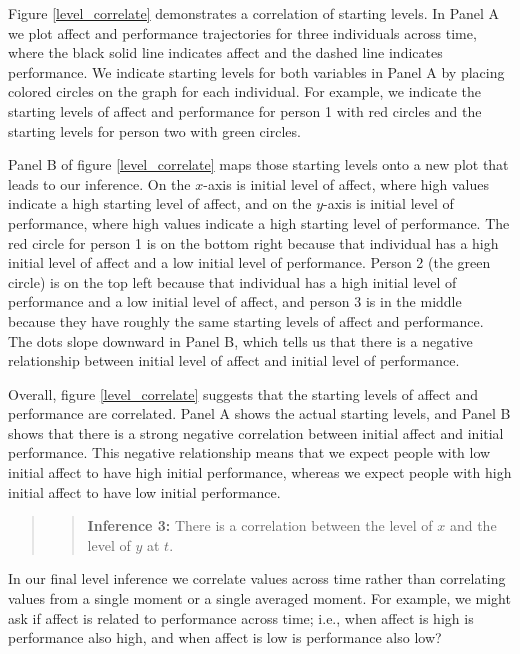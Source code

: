 \documentclass[english,,man]{apa6}
\theoremstyle{definition}
\theoremstyle{definition}
\theoremstyle{definition}
\theoremstyle{remark}
\begin{document}
Figure \ref{level_correlate} demonstrates a correlation of starting
levels. In Panel A we plot affect and performance trajectories for three
individuals across time, where the black solid line indicates affect and
the dashed line indicates performance. We indicate starting levels for
both variables in Panel A by placing colored circles on the graph for
each individual. For example, we indicate the starting levels of affect
and performance for person 1 with red circles and the starting levels
for person two with green circles.

Panel B of figure \ref{level_correlate} maps those starting levels onto
a new plot that leads to our inference. On the \(x\)-axis is initial
level of affect, where high values indicate a high starting level of
affect, and on the \(y\)-axis is initial level of performance, where
high values indicate a high starting level of performance. The red
circle for person 1 is on the bottom right because that individual has a
high initial level of affect and a low initial level of performance.
Person 2 (the green circle) is on the top left because that individual
has a high initial level of performance and a low initial level of
affect, and person 3 is in the middle because they have roughly the same
starting levels of affect and performance. The dots slope downward in
Panel B, which tells us that there is a negative relationship between
initial level of affect and initial level of performance.

Overall, figure \ref{level_correlate} suggests that the starting levels
of affect and performance are correlated. Panel A shows the actual
starting levels, and Panel B shows that there is a strong negative
correlation between initial affect and initial performance. This
negative relationship means that we expect people with low initial
affect to have high initial performance, whereas we expect people with
high initial affect to have low initial performance.

\begin{quote}
\begin{quote}
\textbf{Inference 3:} There is a correlation between the level of \(x\)
and the level of \(y\) at \(t\).
\end{quote}
\end{quote}

In our final level inference we correlate values across time rather than
correlating values from a single moment or a single averaged moment. For
example, we might ask if affect is related to performance across time;
i.e., when affect is high is performance also high, and when affect is
low is performance also low?
\end{document}

